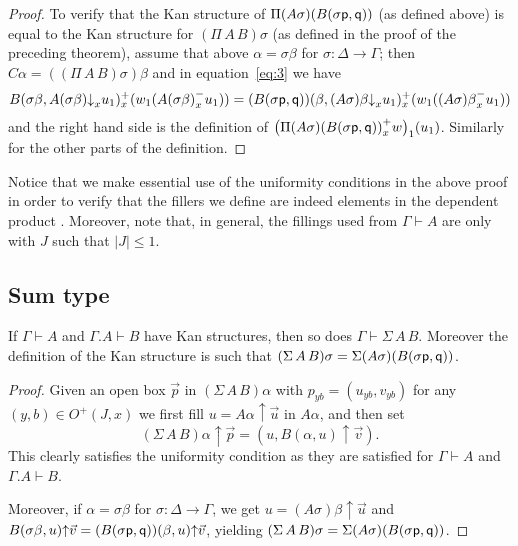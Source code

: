\documentclass[10pt,a4paper]{article}
\newcommand{\pp}{{\sf p}}
\newcommand{\qq}{{\sf q}}
\newcommand{\rup}[1]{#1{\uparrow}}
\newcommand{\rdo}[1]{#1{\downarrow}}
\begin{document}
\begin{proof}
  To verify that the Kan structure of $\Pi (A \sigma) (B (\sigma \pp,
  \qq))$ (as defined above) is equal to the Kan structure for
  $(\Pi\,A\,B) \sigma$ (as defined in the proof of the preceding
  theorem), assume that above $\alpha = \sigma \beta$ for $\sigma
  \colon \Delta \to \Gamma$; then $C \alpha = ((\Pi\,A\,B) \sigma)
  \beta$ and in equation~\eqref{eq:3} we have
  \[
  B(\sigma \beta,\rdo{A(\sigma \beta)}_x u_1)^+_x (w_1 ({A(\sigma
    \beta)}^-_x u_1)) = (B (\sigma \pp, \qq)) (\beta, \rdo{(A\sigma)
    \beta}_x u_1)^+_x (w_1 ({(A \sigma) \beta}^-_x u_1))
  \]
  and the right hand side is the definition of $\bigl({\Pi(A \sigma)
    (B (\sigma \pp, \qq))}^+_x w\bigr)_1 (u_1)$.  Similarly for the
  other parts of the definition.
\end{proof}

Notice that we make essential use of the uniformity conditions in the
above proof in order to verify that the fillers we define are indeed
elements in the dependent product .  Moreover, note that, in general,
the fillings used from $\Gamma \vdash A$ are only with $J$ such
that $\lvert J \rvert \leq 1$.

\subsection{Sum type}

\begin{theorem}
  If $\Gamma \vdash A$ and $\Gamma.A \vdash B$ have Kan structures,
  then so does $\Gamma \vdash \Sigma\,A\,B$.  Moreover the definition
  of the Kan structure is such that $(\Sigma\,A\,B) \sigma = \Sigma (A
  \sigma) (B (\sigma \pp, \qq))$.
\end{theorem}
\begin{proof}
  Given an open box $\vec p$ in $(\Sigma\,A\,B) \alpha$ with
  $p_{yb}=(u_{yb},v_{yb})$ for any $(y,b)\in O^+(J,x)$ we first fill
  $u = \rup {A \alpha} {\vec u}$ in $A \alpha$, and then set
  \[
  \rup{(\Sigma\,A\,B) \alpha} {\vec p} = (u, \rup {B (\alpha, u)}
  {\vec v}).
  \]
  This clearly satisfies the uniformity condition as they are
  satisfied for $\Gamma \vdash A$ and $\Gamma.A \vdash B$.

  Moreover, if $\alpha = \sigma \beta$ for $\sigma \colon \Delta \to
  \Gamma$, we get $u = \rup {(A \sigma) \beta} {\vec u}$ and $\rup {B
    (\sigma \beta, u)} {\vec v} = \rup{(B (\sigma \pp, \qq)) (\beta,
    u)} {\vec v}$, yielding $(\Sigma\,A\,B) \sigma = \Sigma (A \sigma)
  (B (\sigma \pp, \qq))$.
\end{proof}
\end{document}
